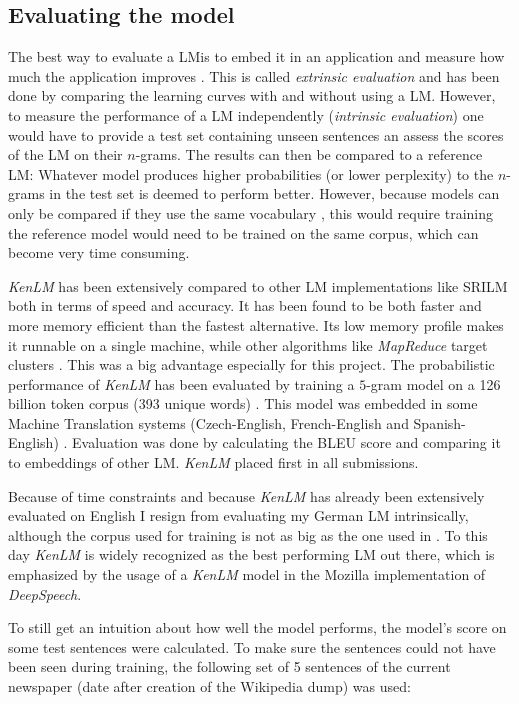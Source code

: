 \subsection{Evaluating the model}

The best way to evaluate a \ac{LM}is to embed it in an application and measure how much the application improves \parencite{slp3}. This is called \textit{extrinsic evaluation} and has been done by comparing the learning curves with and without using a \ac{LM}. However, to measure the performance of a \ac{LM} independently (\textit{intrinsic evaluation}) one would have to provide a test set containing unseen sentences an assess the scores of the \ac{LM} on their $n$-grams. The results can then be compared to a reference \ac{LM}: Whatever model produces higher probabilities (or lower perplexity) to the $n$-grams in the test set is deemed to perform better. However, because models can only be compared if they use the same vocabulary \parencite{slp3}, this would require training the reference model would need to be trained on the same corpus, which can become very time consuming.

\textit{KenLM} has been extensively compared to other \ac{LM} implementations like \ac{SRILM} both in terms of speed and accuracy. It has been found to be both faster and more memory efficient \parencite{kenlm} than the fastest alternative. Its low memory profile makes it runnable on a single machine, while other algorithms like \textit{MapReduce} target clusters \parencite{kenlm_estimation}. This was a big advantage especially for this project. The probabilistic performance of \textit{KenLM} has been evaluated by training a $5$-gram model on a 126 billion token corpus (393 unique words) \parencite{kenlm_estimation}. This model was embedded in some Machine Translation systems (Czech-English, French-English and Spanish-English) . Evaluation was done by calculating the BLEU score and comparing it to embeddings of other \ac{LM}. \textit{KenLM} placed first in all submissions.

Because of time constraints and because \textit{KenLM} has already been extensively evaluated on English I resign from evaluating my German \ac{LM} intrinsically, although the corpus used for training is not as big as the one used in \cite{kenlm_estimation}. To this day \textit{KenLM} is widely recognized as the best performing \ac{LM} out there, which is emphasized by the usage of a \textit{KenLM} model in the Mozilla implementation of \textit{DeepSpeech}.

To still get an intuition about how well the model performs, the model's score on some test sentences were calculated. To make sure the sentences could not have been seen during training, the following set of 5 sentences of the current newspaper (date after creation of the Wikipedia dump) was used:

